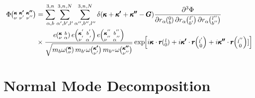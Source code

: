 \begin{equation}
\begin{split}
\Phi\kvkvpkvpp&=\sum_{\alpha,b}^{3,n}\sum_{\alpha',b',l'}^{3,n,N}\sum_{\alpha'',b'',l''}^{3,n,N}\delta(\pmb{\kappa}+\pmb{\kappa'}+\pmb{\kappa''}-\pmb{G})\frac{\partial^3\Phi}{\partial r_\alpha \Ob \partial r_\alpha \lbp \partial r_\alpha \lbpp}\\
&\times \frac{e \kvba e \kvbain{'}e \kvbain{''}}{\sqrt{m_{b}\omega\kv
m_{b'}\omega\kvp m_{b''}\omega\kvpp}}\EXP{i\pmb{\kappa}\cdot \pmb{r}\lO+i\pmb{\kappa'}\cdot \pmb{r}\lOin{'}+i\pmb{\kappa''}\cdot \pmb{r}\lOin{''}]}
\end{split}
\end{equation}


\section{Normal Mode Decomposition}

